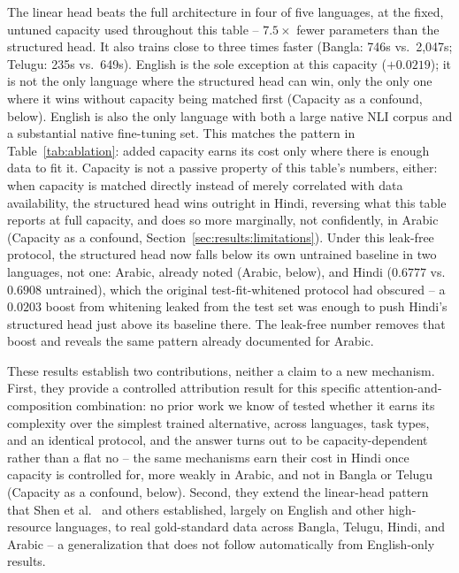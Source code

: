 \documentclass[manuscript]{acmart}
\begin{document}
The linear head beats the full architecture in four of five languages, at the fixed, untuned capacity used throughout this table -- $7.5\times$ fewer parameters than the structured head. It also trains close to three times faster (Bangla: 746s vs.\ 2{,}047s; Telugu: 235s vs.\ 649s). English is the sole exception at this capacity ($+0.0219$); it is not the only language where the structured head can win, only the only one where it wins without capacity being matched first (Capacity as a confound, below). English is also the only language with both a large native NLI corpus and a substantial native fine-tuning set. This matches the pattern in Table~\ref{tab:ablation}: added capacity earns its cost only where there is enough data to fit it. Capacity is not a passive property of this table's numbers, either: when capacity is matched directly instead of merely correlated with data availability, the structured head wins outright in Hindi, reversing what this table reports at full capacity, and does so more marginally, not confidently, in Arabic (Capacity as a confound, Section~\ref{sec:results:limitations}). Under this leak-free protocol, the structured head now falls below its own untrained baseline in two languages, not one: Arabic, already noted (Arabic, below), and Hindi ($0.6777$ vs.\ $0.6908$ untrained), which the original test-fit-whitened protocol had obscured -- a $0.0203$ boost from whitening leaked from the test set was enough to push Hindi's structured head just above its baseline there. The leak-free number removes that boost and reveals the same pattern already documented for Arabic.

These results establish two contributions, neither a claim to a new mechanism. First, they provide a controlled attribution result for this specific attention-and-composition combination: no prior work we know of tested whether it earns its complexity over the simplest trained alternative, across languages, task types, and an identical protocol, and the answer turns out to be capacity-dependent rather than a flat no -- the same mechanisms earn their cost in Hindi once capacity is controlled for, more weakly in Arabic, and not in Bangla or Telugu (Capacity as a confound, below). Second, they extend the linear-head pattern that Shen et al.~\citep{shen2018baseline} and others established, largely on English and other high-resource languages, to real gold-standard data across Bangla, Telugu, Hindi, and Arabic -- a generalization that does not follow automatically from English-only results.
\end{document}
